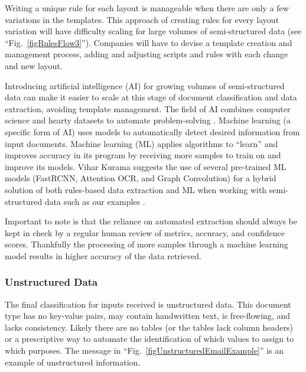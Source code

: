 \documentclass[conference]{IEEEtran}
\begin{document}
Writing a unique rule for each layout is manageable when there are only a few variations in the templates. This approach of creating rules for every layout variation will have difficulty scaling for large volumes of semi-structured data (see ``Fig.~\ref{figRulesFlow3}''). Companies will have to devise a template creation and management process, adding and adjusting scripts and rules with each change and new layout.

Introducing artificial intelligence (AI) for growing volumes of semi-structured data can make it easier to scale at this stage of document classification and data extraction, avoiding template management. The field of AI combines computer science and hearty datasets to automate problem-solving \cite{ibm:ai}. Machine learning (a specific form of AI) uses models to automatically detect desired information from input documents. Machine learning (ML) applies algorithms to ``learn'' and improves accuracy in its program by receiving more samples to train on and improve its models. Vihar Kurama suggests the use of several pre-trained ML models (FastRCNN, Attention OCR, and Graph Convolution) for a hybrid solution of both rules-based data extraction and ML when working with semi-structured data such as our examples \cite{kurama2021a}.

Important to note is that the reliance on automated extraction should always be kept in check by a regular human review of metrics, accuracy, and confidence scores. Thankfully the processing of more samples through a machine learning model results in higher accuracy of the data retrieved.

\subsubsection{Unstructured Data}
The final classification for inputs received is unstructured data. This document type has no key-value pairs, may contain handwritten text, is free-flowing, and lacks consistency. Likely there are no tables (or the tables lack column headers) or a prescriptive way to automate the identification of which values to assign to which purposes. The message in ``Fig.~\ref{figUnstructuredEmailExample}'' is an example of unstructured information.
\end{document}
